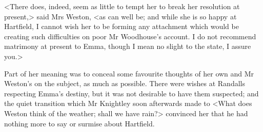 <There does, indeed, seem as little to tempt her to break her resolution at present,> said Mrs Weston, <as can well be; and while she is so happy at Hartfield, I cannot wish her to be forming any attachment which would be creating such difficulties on poor Mr Woodhouse's account. I do not recommend matrimony at present to Emma, though I mean no slight to the state, I assure you.>

Part of her meaning was to conceal some favourite thoughts of her own and Mr Weston's on the subject, as much as possible. There were wishes at Randalls respecting Emma's destiny, but it was not desirable to have them suspected; and the quiet transition which Mr Knightley soon afterwards made to <What does Weston think of the weather; shall we have rain?> convinced her that he had nothing more to say or surmise about Hartfield.